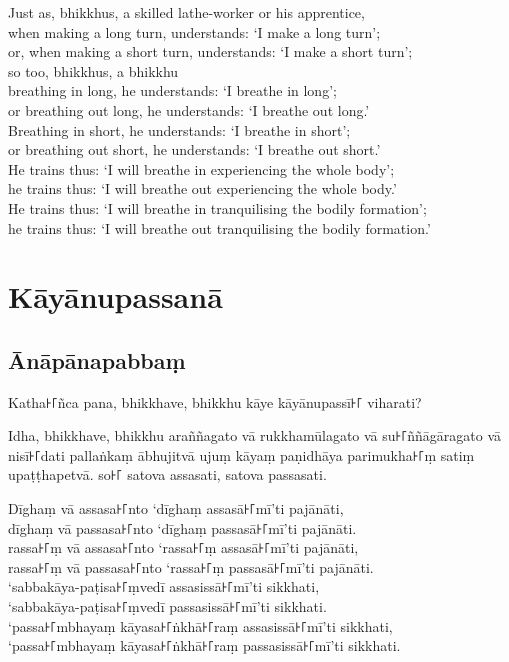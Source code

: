 Just as, bhikkhus, a skilled lathe-worker or his apprentice,\\
when making a long turn, understands: ‘I make a long turn’;\\
or, when making a short turn, understands: ‘I make a short turn’;\\
so too, bhikkhus, a bhikkhu\\
breathing in long, he understands: ‘I breathe in long’;\\
or breathing out long, he understands: ‘I breathe out long.’\\
Breathing in short, he understands: ‘I breathe in short’;\\
or breathing out short, he understands: ‘I breathe out short.’\\
He trains thus: ‘I will breathe in experiencing the whole body’;\\
he trains thus: ‘I will breathe out experiencing the whole body.’\\
He trains thus: ‘I will breathe in tranquilising the bodily formation’;\\
he trains thus: ‘I will breathe out tranquilising the bodily formation.’

\paliPage
\chapter*{Kāyānupassanā}

\section*{Ānāpānapabbaṃ}

Katha꜔꜒ñca pana, bhikkhave, bhikkhu kāye kāyānupassī꜔꜒ viharati?

Idha, bhikkhave, bhikkhu araññagato vā rukkhamūlagato vā su꜔꜒ññāgāragato vā
nisī꜔꜒dati pallaṅkaṃ ābhujitvā ujuṃ kāyaṃ paṇidhāya parimukha꜔꜒ṃ satiṃ upaṭṭhapetvā.
so꜔꜒ satova assasati, satova passasati.

Dīghaṃ vā assasa꜔꜒nto ‘dīghaṃ assasā꜔꜒mī’ti pajānāti,\\
dīghaṃ vā passasa꜔꜒nto ‘dīghaṃ passasā꜔꜒mī’ti pajānāti.\\
rassa꜔꜒ṃ vā assasa꜔꜒nto ‘rassa꜔꜒ṃ assasā꜔꜒mī’ti pajānāti,\\
rassa꜔꜒ṃ vā passasa꜔꜒nto ‘rassa꜔꜒ṃ passasā꜔꜒mī’ti pajānāti.\\
‘sabbakāya-paṭisa꜔꜒ṃvedī assasissā꜔꜒mī’ti sikkhati,\\
‘sabbakāya-paṭisa꜔꜒ṃvedī passasissā꜔꜒mī’ti sikkhati.\\
‘passa꜔꜒mbhayaṃ kāyasa꜔꜒ṅkhā꜔꜒raṃ assasissā꜔꜒mī’ti sikkhati,\\
‘passa꜔꜒mbhayaṃ kāyasa꜔꜒ṅkhā꜔꜒raṃ passasissā꜔꜒mī’ti sikkhati.

